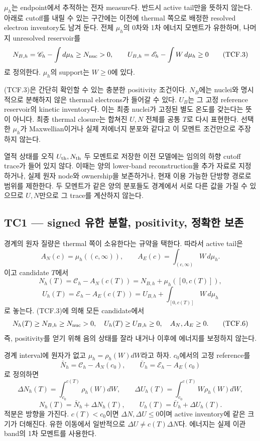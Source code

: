 \documentclass[11pt,a4paper]{article}
\begin{document}
\(\mu_h\)는 endpoint에서 추적하는 전자 measure다. 반드시 active tail만을 뜻하지 않는다. 아래로 cutoff를 내릴 수 있는 구간에는 이전에 thermal 쪽으로 배정한 resolved electron inventory도 남겨 둔다. 전체 \(\mu_h\)의 0차와 1차 에너지 모멘트가 유한하며, 나머지 unresolved reservoir를 \[
N_{B,h}=\mathscr C_h-\int d\mu_h\ge N_{\rm nuc}>0,\qquad
U_{B,h}=\mathscr E_h-\int W\,d\mu_h\ge0
\tag{TCF.3}
\] 로 정의한다. \(\mu_h\)의 support는 \(W\ge0\)에 있다.

(TCF.3)은 간단히 확인할 수 있는 충분한 positivity 조건이다. \(N_B\)에는 nuclei와 명시적으로 분해하지 않은 thermal electrons가 들어갈 수 있다. \(U_B\)는 그 고정 reference reservoir의 kinetic inventory다. 이는 최종 nuclei가 고정된 별도 온도를 갖는다는 뜻이 아니다. 최종 thermal closure는 합쳐진 \(U,N\) 전체를 공통 \(T\)로 다시 표현한다. 선택한 \(\mu_h\)가 Maxwellian이거나 실제 저에너지 분포와 같다고 이 모멘트 조건만으로 주장하지 않는다.

열적 상태를 오직 \(U_{\rm th},N_{\rm th}\) 두 모멘트로 저장한 이전 모델에는 임의의 하향 cutoff trace가 들어 있지 않다. 이때는 양의 lower-band reconstruction을 추가 자료로 지정하거나, 실제 원자 node와 ownership을 보존하거나, 현재 이용 가능한 단방향 경로로 범위를 제한한다. 두 모멘트가 같은 양의 분포들도 경계에서 서로 다른 값을 가질 수 있으므로 \(U,N\)만으로 그 trace를 계산하지 않는다.

\hypertarget{tc1-signed-uxc720uxd55c-uxbd84uxd560-positivity-uxc815uxd655uxd55c-uxbcf4uxc874}{%
\subsection{TC1 --- signed 유한 분할, positivity, 정확한 보존}\label{tc1-signed-uxc720uxd55c-uxbd84uxd560-positivity-uxc815uxd655uxd55c-uxbcf4uxc874}}

경계의 원자 질량은 thermal 쪽이 소유한다는 규약을 택한다. 따라서 active tail은 \[
A_N(c)=\mu_h((c,\infty)),\qquad
A_E(c)=\int_{(c,\infty)}W\,d\mu_h .
\tag{TCF.4}
\] 이고 candidate \(T\)에서 \[
N_h(T)=\mathscr C_h-A_N(c(T))
      =N_{B,h}+\mu_h([0,c(T)]),
\] \[
U_h(T)=\mathscr E_h-A_E(c(T))
      =U_{B,h}+\int_{[0,c(T)]}W\,d\mu_h
\tag{TCF.5}
\] 로 놓는다. (TCF.3)에 의해 모든 candidate에서 \[
N_h(T)\ge N_{B,h}\ge N_{\rm nuc}>0,\quad U_h(T)\ge U_{B,h}\ge0,
\quad A_N,A_E\ge0 .
\tag{TCF.6}
\] 즉, positivity를 얻기 위해 음의 상태를 잘라 내거나 이후에 에너지를 보정하지 않는다.

경계 interval에 원자가 없고 \(\mu_h=\rho_h(W)dW\)라고 하자. \(c_0\)에서의 고정 reference를 \[
\bar N_h=\mathscr C_h-A_N(c_0),\qquad
\bar U_h=\mathscr E_h-A_E(c_0)
\tag{TCF.7}
\] 로 정의하면 \[
\Delta N_h(T)=\int_{c_0}^{c(T)}\rho_h(W)dW,\qquad
\Delta U_h(T)=\int_{c_0}^{c(T)}W\rho_h(W)dW,
\tag{TCF.8}
\] \[
N_h(T)=\bar N_h+\Delta N_h(T),\qquad
U_h(T)=\bar U_h+\Delta U_h(T).
\tag{TCF.9}
\] 적분은 방향을 가진다. \(c(T)<c_0\)이면 \(\Delta N,\Delta U\le0\)이며 active inventory에 같은 크기가 더해진다. 유한 이동에서 일반적으로 \(\Delta U\ne c(T)\Delta N\)다. 에너지는 실제 이관 band의 1차 모멘트를 사용한다.
\end{document}
